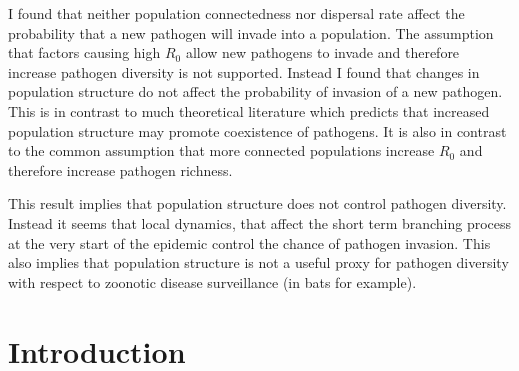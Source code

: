 I found that neither population connectedness nor dispersal rate affect the probability that a new pathogen will invade into a population.
The assumption that factors causing high $R_0$ allow new pathogens to invade and therefore increase pathogen diversity is not supported.
Instead I found that changes in population structure do not affect the probability of invasion of a new pathogen.
This is in contrast to much theoretical literature which predicts that increased population structure may promote coexistence of pathogens.
It is also in contrast to the common assumption that more connected populations increase $R_0$ and therefore increase pathogen richness.

This result implies that population structure does not control pathogen diversity.
Instead it seems that local dynamics, that affect the short term branching process at the very start of the epidemic control the chance of pathogen invasion.
This also implies that population structure is not a useful proxy for pathogen diversity with respect to zoonotic disease surveillance (in bats for example).









\section{Introduction}





